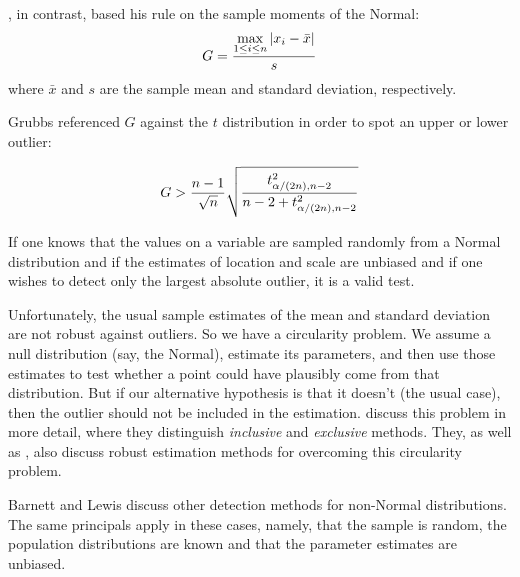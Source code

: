 \documentclass[12pt]{article}
\begin{document}
\cite{Grubbs}, in contrast, based his rule on the sample moments of the Normal:
\begin{equation*}
G = {{\max\limits_{1 \leq i \leq n} \vert x_i - \bar{x} \vert} \over s}\\
\end{equation*}
where $\bar{x}$ and $s$ are the sample mean and standard deviation, respectively.

Grubbs referenced $G$ against the $t$ distribution in order to spot an upper or lower outlier:

\begin{equation*}
G > {{n - 1} \over{\sqrt{n}}} \sqrt{t^2_{\alpha / (2n), n-2}\over{n-2 + t^2_{\alpha / (2n), n-2}}}
\end{equation*}

If one knows that the values on a variable are sampled randomly from a Normal distribution and if the estimates of location and scale are unbiased and if one wishes to detect only the largest absolute outlier, it is a valid test.

Unfortunately, the usual sample estimates of the mean and standard deviation are not robust against outliers. So we have a circularity problem. We assume a null distribution (say, the Normal), estimate its parameters, and then use those estimates to test whether a point could have plausibly come from that distribution. But if our alternative hypothesis is that it doesn't (the usual case), then the outlier should not be included in the estimation. \cite{BarnettLewis} discuss this problem in more detail, where they distinguish {\it inclusive} and {\it exclusive} methods. They, as well as \cite {RousseeuwLeroy}, also discuss robust estimation methods for overcoming this circularity problem.

Barnett and Lewis discuss other detection methods for non-Normal distributions. The same principals apply in these cases, namely, that the sample is random, the population distributions are known and that the parameter estimates are unbiased.
\end{document}
